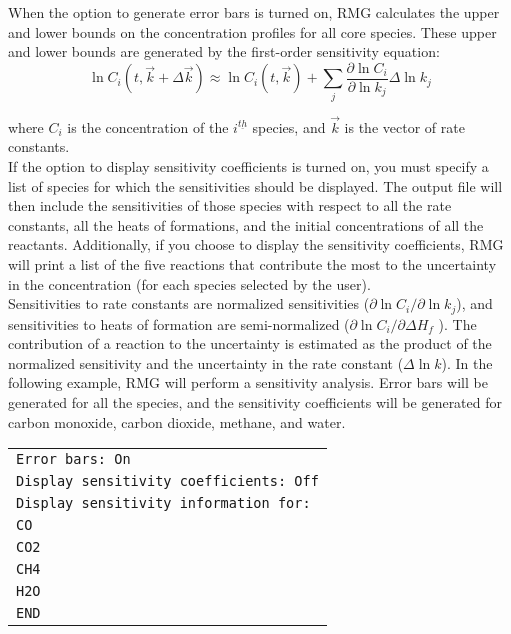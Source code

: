 \documentclass[12pt,letterpaper]{article}
\begin{document}
When the option to generate error bars is turned on, RMG calculates
the upper and lower bounds on the concentration profiles for all core species.
These upper and lower bounds are generated by the first-order sensitivity
equation:\\

\begin{equation}
\ln C_i \left( t,\overrightarrow{k} + \Delta \overrightarrow{k} \right) \approx \ln C_i \left( t,\overrightarrow{k} \right) + \sum_j \frac{\partial \ln C_i}{\partial \ln k_j} \Delta \ln k_j \nonumber
\end{equation} 

where $C_i$ is the concentration of the $i^{\underline{th}}$ species, and $\overrightarrow{k}$ is the vector of rate
constants.\\

If the option to display sensitivity coefficients is turned on, you must
specify a list of species for which the sensitivities should be displayed. The
output file will then include the sensitivities of those species with respect to
all the rate constants, all the heats of formations, and the initial concentrations
of all the reactants. Additionally, if you choose to display the sensitivity
coefficients, RMG will print a list of the five reactions that contribute the
most to the uncertainty in the concentration (for each species selected by the
user).\\

Sensitivities to rate constants are normalized sensitivities ($\partial \ln C_i/ \partial \ln k_j$),
and sensitivities to heats of formation are semi-normalized ($ \partial \ln C_i/ \partial \Delta H_f$ ).
The contribution of a reaction to the uncertainty is estimated as the product
of the normalized sensitivity and the uncertainty in the rate constant ($\Delta \ln k$).
In the following example, RMG will perform a sensitivity analysis. Error
bars will be generated for all the species, and the sensitivity coefficients will
be generated for carbon monoxide, carbon dioxide, methane, and water.\\

\begin{tabular}{l}
\texttt{Error bars: On} \\
\texttt{Display sensitivity coefficients: Off} \\
\texttt{Display sensitivity information for:} \\
\texttt{CO} \\
\texttt{CO2} \\
\texttt{CH4} \\
\texttt{H2O} \\
\texttt{END} \\
\end{tabular}\\
\end{document}
